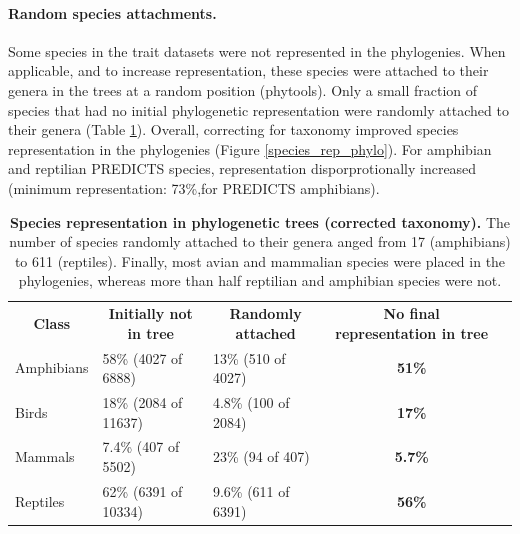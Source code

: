 \paragraph{Random species attachments.} Some species in the trait datasets were not represented in the phylogenies. When applicable, and to increase representation, these species were attached to their genera in the trees at a random position (phytools). Only a small fraction of species that had no initial phylogenetic representation were randomly attached to their genera (Table \ref{random_attachments_phy}).
Overall, correcting for taxonomy improved species representation in the phylogenies (Figure \ref{species_rep_phylo}). For amphibian and reptilian PREDICTS species, representation disporprotionally increased (minimum representation: 73\%,for PREDICTS amphibians). 

\begin{table}[h!]
\renewcommand{\baselinestretch}{1}
\renewcommand{\arraystretch}{1.5}
\begin{center}\fontsize{9}{11}\selectfont
\caption[Species representation in phylogenetic trees (corrected taxonomy)]{\textbf{Species representation in phylogenetic trees (corrected taxonomy).} The number of species randomly attached to their genera anged from 17 (amphibians) to 611 (reptiles). Finally, most avian and mammalian species were placed in the phylogenies, whereas more than half reptilian and amphibian species were not.} 
\label{random_attachments_phy}
\begin{tabular}{|l|l|l|c|l}
\cline{1-4}
\multicolumn{1}{|c|}{\textbf{Class}} & \multicolumn{1}{c|}{\textbf{Initially not in tree}} & \multicolumn{1}{c|}{\textbf{Randomly attached}} & \textbf{No final representation in tree} &  \\ \cline{1-4}
Amphibians                  & 58\% (4027 of 6888)                           & 13\% (510 of 4027)                     & \textbf{51\%}             &  \\ \cline{1-4}
Birds                       & 18\% (2084 of 11637)                          & 4.8\% (100 of 2084)                    & \textbf{17\%}             &  \\ \cline{1-4}
Mammals                     & 7.4\% (407 of 5502)                           & 23\% (94 of 407)                       & \textbf{5.7\%}            &  \\ \cline{1-4}
Reptiles                    & 62\% (6391 of 10334)                          & 9.6\% (611 of 6391)                    & \textbf{56\%}             &  \\ \cline{1-4}
\end{tabular}
\end{center}
\end{table}

